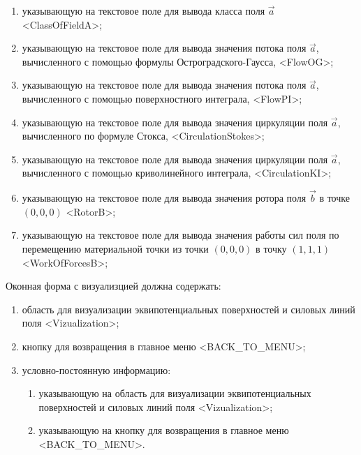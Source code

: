 \documentclass[14pt,a4paper,final]{extreport}
\begin{document}
\begin{enumerate}[label=\arabic*.,ref=\arabic*]
\begin{enumerate}[label=\asbuk*)]
\pagebreak %

			\item указывающую на текстовое поле для вывода класса поля \( \vec a \) <ClassOfFieldA>;
			\item указывающую на текстовое поле для вывода значения потока поля \( \vec a \), вычисленного с помощью формулы Остроградского-Гаусса, <FlowOG>;
			\item указывающую на текстовое поле для вывода значения потока поля \( \vec a \), вычисленного с помощью поверхностного интеграла, <FlowPI>;
			\item указывающую на текстовое поле для вывода значения циркуляции поля \( \vec a \), вычисленного по формуле Стокса, <CirculationStokes>;
			\item указывающую на текстовое поле для вывода значения циркуляции поля \( \vec a \), вычисленного с помощью криволинейного интеграла, <CirculationKI>;
			\item указывающую на текстовое поле для вывода значения ротора поля \( \vec b \) в точке \( (0, 0, 0) \) <RotorB>;
			\item указывающую на текстовое поле для вывода значения работы сил поля по перемещению материальной точки из точки  \( (0, 0, 0) \) в точку \( (1, 1, 1) \) <WorkOfForcesB>;
		\end{enumerate}
\end{enumerate}


Оконная форма с визуализцией должна содержать:
\begin{enumerate}[label=\arabic*.,ref=\arabic*]
	\item область для визуализации эквипотенциальных поверхностей и силовых линий поля <Vizualization>;
	\item кнопку для возвращения в главное меню <BACK\_TO\_MENU>;
	\item условно-постоянную информацию:
		\begin{enumerate}[label=\asbuk*)]
			\item указывающую на область для визуализации эквипотенциальных поверхностей и силовых линий поля <Vizualization>;
			\item указывающую на кнопку для возвращения в главное меню <BACK\_TO\_MENU>.
		\end{enumerate}
\end{enumerate}
\end{document}
